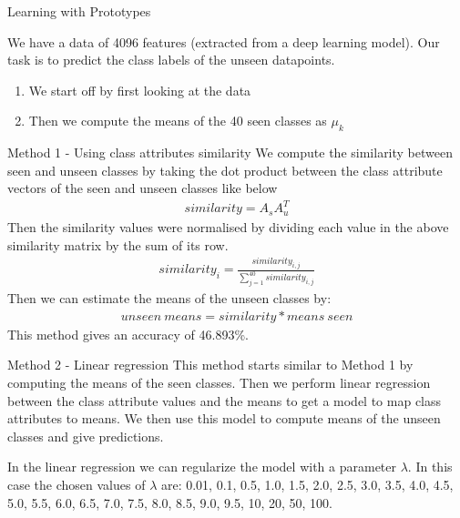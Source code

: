 \documentclass[a4paper,11pt]{article}
\begin{document}
\begin{mlsolution}

\begin{section}{Learning with Prototypes}
    
    We have a data of 4096 features (extracted from a deep learning model). Our task is to predict the class labels of the unseen datapoints.
    \begin{enumerate}
        \item We start off by first looking at the data
        \item Then we compute the means of the 40 seen classes as $\mu_k$
    \end{enumerate}

    \begin{subsection}{Method 1 - Using class attributes similarity}
        We compute the similarity between seen and unseen classes by taking the dot product between the class attribute vectors of the seen and unseen classes like below
        \begin{align*}
            similarity = A_{s}A_{u}^T
        \end{align*}
        Then the similarity values were normalised by dividing each value in the above similarity matrix by the sum of its row.
        \begin{align*}
            similarity_i = \frac{similarity_{i,j}}{\sum_{j=1}^{40}{similarity_{i,j}}}
        \end{align*}
        Then we can estimate the means of the unseen classes by:
        \begin{align*}
            unseen\ means = similarity*means\ seen
        \end{align*}
        This method gives an accuracy of 46.893\%.
        
    \end{subsection}
    \begin{subsection}{Method 2 - Linear regression}
        This method starts similar to Method 1 by computing the means of the seen classes. Then we perform linear regression between the class attribute values and the means to get a model to map class attributes to means. We then use this model to compute means of the unseen classes and give predictions.

        In the linear regression we can regularize the model with a parameter $\lambda$. In this case the chosen values of $\lambda$ are: 0.01, 0.1, 0.5, 1.0, 1.5, 2.0, 2.5, 3.0, 3.5, 4.0, 4.5, 5.0, 5.5, 6.0, 6.5, 7.0, 7.5, 8.0, 8.5, 9.0, 9.5, 10, 20, 50, 100. 


\end{subsection}
\end{section}
\end{mlsolution}
\end{document}

